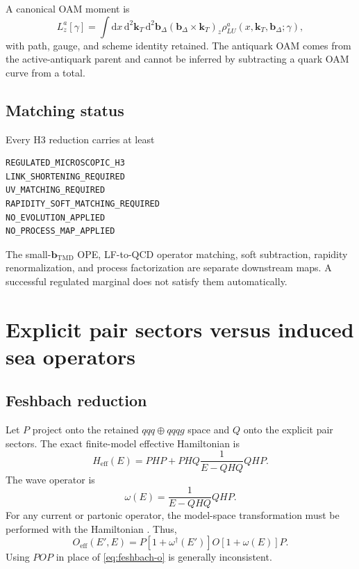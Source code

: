\documentclass[11pt]{article}
\newcommand{\kT}{\bm{k}_{T}}
\newcommand{\bD}{\bm{b}_{\Delta}}
\newcommand{\bM}{\bm{b}_{\mathrm{TMD}}}
\newcommand{\dd}{\mathrm{d}}
\newcommand{\eff}{\mathrm{eff}}
\begin{document}
A canonical OAM moment is
\begin{equation}
 L_z^a[\gamma]
 =
 \int\dd x\,\dd^2\kT\,\dd^2\bD
 \left(\bD\times\kT\right)_z
 \rho_{LU}^{a}(x,\kT,\bD;\gamma),
 \label{eq:oam-moment}
\end{equation}
with path, gauge, and scheme identity retained.  The antiquark OAM comes from
the active-antiquark parent and cannot be inferred by subtracting a quark OAM
curve from a total.

\subsection{Matching status}

Every H3 reduction carries at least
\begin{verbatim}
REGULATED_MICROSCOPIC_H3
LINK_SHORTENING_REQUIRED
UV_MATCHING_REQUIRED
RAPIDITY_SOFT_MATCHING_REQUIRED
NO_EVOLUTION_APPLIED
NO_PROCESS_MAP_APPLIED
\end{verbatim}
The small-\(\bM\) OPE, LF-to-QCD operator matching, soft subtraction, rapidity
renormalization, and process factorization are separate downstream maps.  A
successful regulated marginal does not satisfy them automatically.

\section{Explicit pair sectors versus induced sea operators}
\label{sec:feshbach}

\subsection{Feshbach reduction}

Let \(P\) project onto the retained \(qqq\oplus qqqg\) space and \(Q\) onto
the explicit pair sectors.  The exact finite-model effective Hamiltonian is
\begin{equation}
 H_{\eff}(E)
 =PHP+PHQ\frac{1}{E-QHQ}QHP.
 \label{eq:feshbach-h}
\end{equation}
The wave operator is
\begin{equation}
 \omega(E)
 =\frac{1}{E-QHQ}QHP.
\end{equation}
For any current or partonic operator, the model-space transformation must be
performed with the Hamiltonian \cite{Feshbach1958,Karmanov2008}.  Thus,
\begin{equation}
 O_{\eff}(E',E)
 =P\left[1+\omega^{\dagger}(E')\right]
 O
 \left[1+\omega(E)\right]P.
 \label{eq:feshbach-o}
\end{equation}
Using \(POP\) in place of \cref{eq:feshbach-o} is generally inconsistent.
\end{document}
